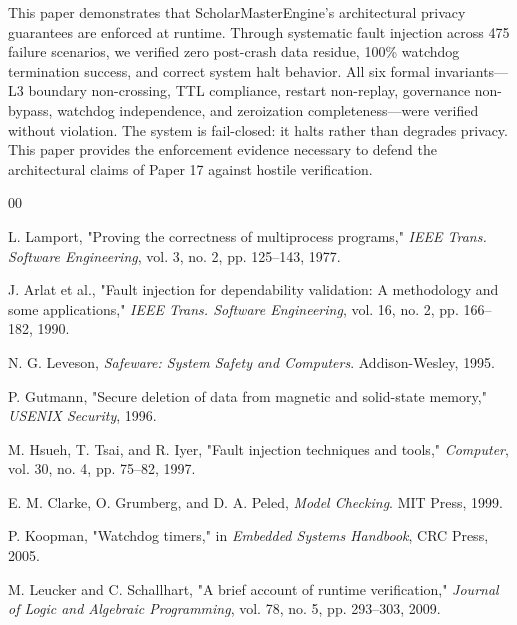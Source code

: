 \documentclass[conference]{IEEEtran}
\begin{document}
This paper demonstrates that ScholarMasterEngine's architectural privacy guarantees are enforced at runtime. Through systematic fault injection across 475 failure scenarios, we verified zero post-crash data residue, 100\% watchdog termination success, and correct system halt behavior. All six formal invariants—L3 boundary non-crossing, TTL compliance, restart non-replay, governance non-bypass, watchdog independence, and zeroization completeness—were verified without violation. The system is fail-closed: it halts rather than degrades privacy. This paper provides the enforcement evidence necessary to defend the architectural claims of Paper 17 against hostile verification.

\begin{thebibliography}{00}

 L. Lamport, "Proving the correctness of multiprocess programs," \textit{IEEE Trans. Software Engineering}, vol. 3, no. 2, pp. 125–143, 1977.


 J. Arlat et al., "Fault injection for dependability validation: A methodology and some applications," \textit{IEEE Trans. Software Engineering}, vol. 16, no. 2, pp. 166–182, 1990.

 N. G. Leveson, \textit{Safeware: System Safety and Computers}. Addison-Wesley, 1995.


 P. Gutmann, "Secure deletion of data from magnetic and solid-state memory," \textit{USENIX Security}, 1996.


 M. Hsueh, T. Tsai, and R. Iyer, "Fault injection techniques and tools," \textit{Computer}, vol. 30, no. 4, pp. 75–82, 1997.


 E. M. Clarke, O. Grumberg, and D. A. Peled, \textit{Model Checking}. MIT Press, 1999.

 P. Koopman, "Watchdog timers," in \textit{Embedded Systems Handbook}, CRC Press, 2005.


 M. Leucker and C. Schallhart, "A brief account of runtime verification," \textit{Journal of Logic and Algebraic Programming}, vol. 78, no. 5, pp. 293–303, 2009.


\end{thebibliography}
\end{document}
